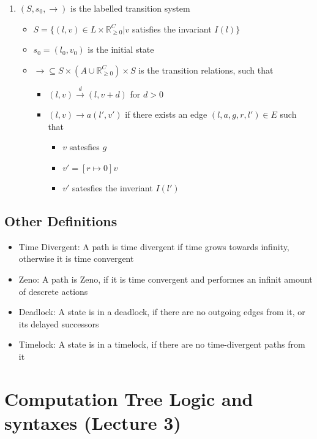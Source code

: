\documentclass{article}
\begin{document}
\begin{enumerate}
\begin{itemize}
				\end{itemize}
			\item $(S,s_0,\rightarrow)$ is the labelled transition system
				\begin{itemize}
					\item $S=\{(l,v)\in L\times\mathbb{R}^C_{\geq0}|v$ satisfies the invariant $I(l)\}$
					\item $s_0=(l_0,v_0)$ is the initial state
					\item $\rightarrow\subseteq S\times(A\cup\mathbb{R}^C_{\geq0})\times S$ is the transition relations, such that
						\begin{itemize}
							\item $(l,v)\xrightarrow{d}(l,v+d)$ for $d>0$
							\item $(l,v)\rightarrow{a}(l',v')$ if there exists an edge $(l, a, g, r, l')\in E$ such that
								\begin{itemize}
									\item $v$ satesfies $g$
									\item $v'=[r\mapsto0]v$
									\item $v'$ satesfies the inveriant $I(l')$
								\end{itemize}
						\end{itemize}
				\end{itemize}
		\end{enumerate}

		\subsection{Other Definitions}
			\begin{itemize}
				\item Time Divergent: A path is time divergent if time grows towards infinity, otherwise it is time convergent
				\item Zeno: A path is Zeno, if it is time convergent and performes an infinit amount of descrete actions
				\item Deadlock: A state is in a deadlock, if there are no outgoing edges from it, or its delayed successors
				\item Timelock: A state is in a timelock, if there are no time-divergent paths from it
			\end{itemize}
	
	\section{Computation Tree Logic and syntaxes (Lecture 3)}
\end{document}
